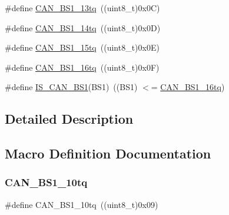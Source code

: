 \begin{DoxyCompactItemize}
\item 
\#define \hyperlink{group___c_a_n__time__quantum__in__bit__segment__1_ga2087caec94be44837c1e6965da7f6236}{C\+A\+N\+\_\+\+B\+S1\+\_\+13tq}~((uint8\+\_\+t)0x0\+C)
\item 
\#define \hyperlink{group___c_a_n__time__quantum__in__bit__segment__1_gac0c71e1020a4fbaf66bce754bd54d8cb}{C\+A\+N\+\_\+\+B\+S1\+\_\+14tq}~((uint8\+\_\+t)0x0\+D)
\item 
\#define \hyperlink{group___c_a_n__time__quantum__in__bit__segment__1_gaa52c8674dc7caae1089e5276cd13db5f}{C\+A\+N\+\_\+\+B\+S1\+\_\+15tq}~((uint8\+\_\+t)0x0\+E)
\item 
\#define \hyperlink{group___c_a_n__time__quantum__in__bit__segment__1_ga3be52c699f5618cc318c143ee42f5966}{C\+A\+N\+\_\+\+B\+S1\+\_\+16tq}~((uint8\+\_\+t)0x0\+F)
\item 
\#define \hyperlink{group___c_a_n__time__quantum__in__bit__segment__1_ga225f1457e1c6b8fc3b5af0f463933152}{I\+S\+\_\+\+C\+A\+N\+\_\+\+B\+S1}(B\+S1)~((B\+S1) $<$= \hyperlink{group___c_a_n__time__quantum__in__bit__segment__1_ga3be52c699f5618cc318c143ee42f5966}{C\+A\+N\+\_\+\+B\+S1\+\_\+16tq})
\end{DoxyCompactItemize}


\subsection{Detailed Description}


\subsection{Macro Definition Documentation}
\mbox{\label{group___c_a_n__time__quantum__in__bit__segment__1_gaf1b474aa632787e70bedd0c5dfdbf5ed}} 
\subsubsection{\texorpdfstring{C\+A\+N\+\_\+\+B\+S1\+\_\+10tq}{CAN\_BS1\_10tq}}
{\footnotesize\ttfamily \#define C\+A\+N\+\_\+\+B\+S1\+\_\+10tq~((uint8\+\_\+t)0x09)}

